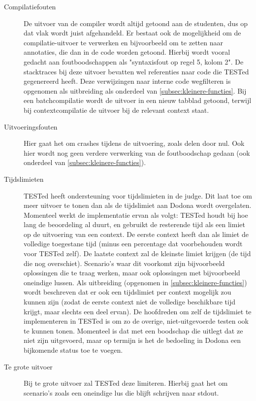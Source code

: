 \begin{description}
    \item[Compilatiefouten] De uitvoer van de compiler wordt altijd getoond aan de studenten, dus op dat vlak wordt juist afgehandeld.
    Er bestaat ook de mogelijkheid om de compilatie-uitvoer te verwerken en bijvoorbeeld om te zetten naar annotaties, die dan in de code worden getoond.
    Hierbij wordt vooral gedacht aan foutboodschappen als "syntaxisfout op regel 5, kolom 2".
    De stacktraces bij deze uitvoer bevatten wel referenties naar code die TESTed gegenereerd heeft.
    Deze verwijzingen naar interne code wegfilteren is opgenomen als uitbreiding als onderdeel van \cref{subsec:kleinere-functies}.
    Bij een batchcompilatie wordt de uitvoer in een nieuw tabblad getoond, terwijl bij contextcompilatie de uitvoer bij de relevant context staat.
    \item[Uitvoeringsfouten] Hier gaat het om crashes tijdens de uitvoering, zoals delen door nul.
    Ook hier wordt nog geen verdere verwerking van de foutboodschap gedaan (ook onderdeel van \cref{subsec:kleinere-functies}).
    \item[Tijdslimieten] TESTed heeft ondersteuning voor tijdslimieten in de judge.
    Dit laat toe om meer uitvoer te tonen dan als de tijdslimiet aan Dodona wordt overgelaten.
    Momenteel werkt de implementatie ervan als volgt: TESTed houdt bij hoe lang de beoordeling al duurt, en gebruikt de resterende tijd als een limiet op de uitvoering van een context.
    De eerste context heeft dan als limiet de volledige toegestane tijd (minus een percentage dat voorbehouden wordt voor TESTed zelf).
    De laatste context zal de kleinste limiet krijgen (de tijd die nog overschiet).
    Scenario's waar dit voorkomt zijn bijvoorbeeld oplossingen die te traag werken, maar ook oplossingen met bijvoorbeeld oneindige lussen.
    Als uitbreiding (opgenomen in \cref{subsec:kleinere-functies}) wordt beschreven dat er ook een tijdslimiet per context mogelijk zou kunnen zijn (zodat de eerste context niet de volledige beschikbare tijd krijgt, maar slechts een deel ervan).
    De hoofdreden om zelf de tijdslimiet te implementeren in TESTed is om zo de overige, niet-uitgevoerde testen ook te kunnen tonen.
    Momenteel is dat met een boodschap die uitlegt dat ze niet zijn uitgevoerd, maar op termijn is het de bedoeling in Dodona een bijkomende status toe te voegen.
    \item[Te grote uitvoer] Bij te grote uitvoer zal TESTed deze limiteren.
    Hierbij gaat het om scenario's zoals een oneindige lus die blijft schrijven naar stdout.

\end{description}
